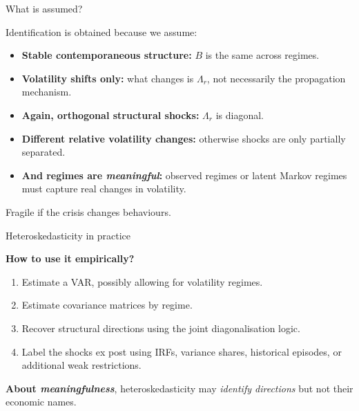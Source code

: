 \documentclass{beamer}
\begin{document}
\begin{frame}{What is assumed?}
\small

Identification is obtained because we assume:

\medskip

\begin{itemize}\itemsep5pt
  \item \textbf{Stable contemporaneous structure:} $B$ is the same across regimes.
  \item \textbf{Volatility shifts only:} what changes is $\Lambda_r$, not necessarily the propagation mechanism.
  \item \textbf{Again, orthogonal structural shocks:} $\Lambda_r$ is diagonal.
  \item \textbf{Different relative volatility changes:} otherwise shocks are only partially separated.
  \item \textbf{And regimes are \textit{meaningful}:} observed regimes or latent Markov regimes must capture real changes in volatility.
\end{itemize}

\medskip

Fragile if the crisis changes behaviours.

\end{frame}


\begin{frame}{Heteroskedasticity in practice}
\small

\textbf{How to use it empirically?}

\medskip

\begin{enumerate}\itemsep5pt
  \item Estimate a VAR, possibly allowing for volatility regimes.
  \item Estimate covariance matrices by regime.
  \item Recover structural directions using the joint diagonalisation logic.
  \item Label the shocks ex post using IRFs, variance shares, historical episodes, or additional weak restrictions.
\end{enumerate}

\medskip

\textbf{About \textit{meaningfulness}}, heteroskedasticity may \emph{identify directions} but not their economic names.

\end{frame}
\end{document}
